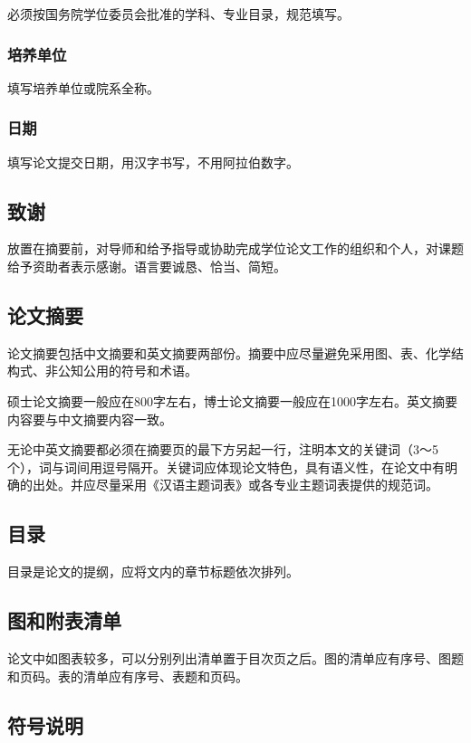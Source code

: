 \documentclass[a4paper,12pt,oneside,openany]{book}
\begin{document}
必须按国务院学位委员会批准的学科、专业目录，规范填写。


\subsubsection{培养单位}

填写培养单位或院系全称。


\subsubsection{日期}

填写论文提交日期，用汉字书写，不用阿拉伯数字。


\subsection{致谢}

放置在摘要前，对导师和给予指导或协助完成学位论文工作的组织和个人，对课题给予资助者表示感谢。语言要诚恳、恰当、简短。


\subsection{论文摘要}

论文摘要包括中文摘要和英文摘要两部份。摘要中应尽量避免采用图、表、化学结构式、非公知公用的符号和术语。

硕士论文摘要一般应在800字左右，博士论文摘要一般应在1000字左右。英文摘要内容要与中文摘要内容一致。

无论中英文摘要都必须在摘要页的最下方另起一行，注明本文的关键词（3～5个），词与词间用逗号隔开。关键词应体现论文特色，具有语义性，在论文中有明确的出处。并应尽量采用《汉语主题词表》或各专业主题词表提供的规范词。 


\subsection{目录}

目录是论文的提纲，应将文内的章节标题依次排列。


\subsection{图和附表清单}

论文中如图表较多，可以分别列出清单置于目次页之后。图的清单应有序号、图题和页码。表的清单应有序号、表题和页码。


\subsection{符号说明}
\end{document}
